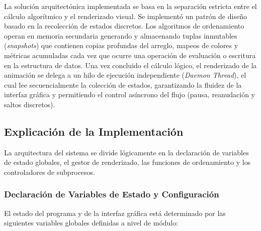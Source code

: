 \documentclass[conference]{IEEEtran}
\begin{document}
La solución arquitectónica implementada se basa en la separación estricta entre el cálculo algorítmico y el renderizado visual. Se implementó un patrón de diseño basado en la recolección de estados discretos. Los algoritmos de ordenamiento operan en memoria secundaria generando y almacenando tuplas inmutables (\textit{snapshots}) que contienen copias profundas del arreglo, mapeos de colores y métricas acumuladas cada vez que ocurre una operación de evaluación o escritura en la estructura de datos. Una vez concluido el cálculo lógico, el renderizado de la animación se delega a un hilo de ejecución independiente (\textit{Daemon Thread}), el cual lee secuencialmente la colección de estados, garantizando la fluidez de la interfaz gráfica y permitiendo el control asíncrono del flujo (pausa, reanudación y saltos discretos).

\subsection{Explicación de la Implementación}
La arquitectura del sistema se divide lógicamente en la declaración de variables de estado globales, el gestor de renderizado, las funciones de ordenamiento y los controladores de subprocesos.

\subsubsection{Declaración de Variables de Estado y Configuración}
El estado del programa y de la interfaz gráfica está determinado por las siguientes variables globales definidas a nivel de módulo:
\end{document}
